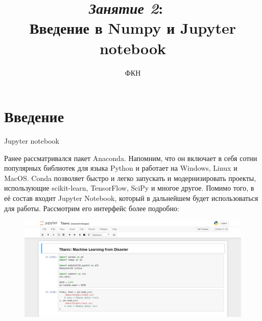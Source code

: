 \documentclass[8pt,pdf,hyperref={unicode}, xcolor=dvipsnames, fleqn]{beamer}
\title[Введение в Numpy и Jupyter notebook]{\textit{Занятие 2}: ~\\ Введение в Numpy и Jupyter notebook}
\author{ФКН}
\institute{Воронежский государственный университет}
\date{

	


			
}
\begin{document}
{\titlepageBlue
\begin{frame}
  \titlepage
\end{frame}
}





\section{Введение}
\begin{frame}{Jupyter notebook}

Ранее рассматривался пакет Anaconda. Напомним, что он включает в себя сотни популярных библиотек для языка Python и работает на Windows, Linux и MacOS. Conda позволяет быстро и легко запускать и модернизировать проекты, использующие scikit-learn, TensorFlow, SciPy и многое другое. Помимо того, в её состав входит Jupyter Notebook, который в дальнейшем будет использоваться для работы. Рассмотрим его интерфейс более подробно:

\begin{figure}
	\includegraphics[width=1.0\textwidth]{Images/jupyter.png}
\end{figure}


\end{frame}
\end{document}
